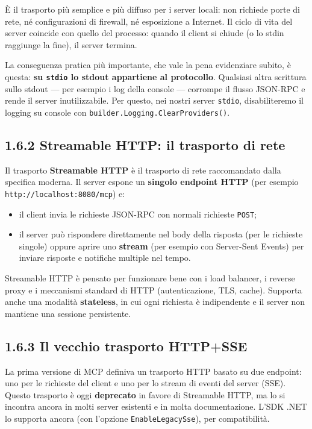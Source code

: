 \documentclass[
  italian,
  10pt,
]{book}
\providecommand{\tightlist}{%
  \setlength{\itemsep}{0pt}\setlength{\parskip}{0pt}}
\begin{document}
È il trasporto più semplice e più diffuso per i server locali: non
richiede porte di rete, né configurazioni di firewall, né esposizione a
Internet. Il ciclo di vita del server coincide con quello del processo:
quando il client si chiude (o lo stdin raggiunge la fine), il server
termina.

La conseguenza pratica più importante, che vale la pena evidenziare
subito, è questa: \textbf{su \texttt{stdio} lo stdout appartiene al
protocollo}. Qualsiasi altra scrittura sullo stdout --- per esempio i
log della console --- corrompe il flusso JSON-RPC e rende il server
inutilizzabile. Per questo, nei nostri server \texttt{stdio},
disabiliteremo il logging su console con
\texttt{builder.Logging.ClearProviders()}.

\subsection{1.6.2 Streamable HTTP: il trasporto di
rete}\label{streamable-http-il-trasporto-di-rete}

Il trasporto \textbf{Streamable HTTP} è il trasporto di rete
raccomandato dalla specifica moderna. Il server espone un
\textbf{singolo endpoint HTTP} (per esempio
\texttt{http://localhost:8080/mcp}) e:

\begin{itemize}
\tightlist
\item
  il client invia le richieste JSON-RPC con normali richieste
  \texttt{POST};
\item
  il server può rispondere direttamente nel body della risposta (per le
  richieste singole) oppure aprire uno \textbf{stream} (per esempio con
  Server-Sent Events) per inviare risposte e notifiche multiple nel
  tempo.
\end{itemize}

Streamable HTTP è pensato per funzionare bene con i load balancer, i
reverse proxy e i meccanismi standard di HTTP (autenticazione, TLS,
cache). Supporta anche una modalità \textbf{stateless}, in cui ogni
richiesta è indipendente e il server non mantiene una sessione
persistente.

\subsection{1.6.3 Il vecchio trasporto
HTTP+SSE}\label{il-vecchio-trasporto-httpsse}

La prima versione di MCP definiva un trasporto HTTP basato su due
endpoint: uno per le richieste del client e uno per lo stream di eventi
del server (SSE). Questo trasporto è oggi \textbf{deprecato} in favore
di Streamable HTTP, ma lo si incontra ancora in molti server esistenti e
in molta documentazione. L'SDK .NET lo supporta ancora (con l'opzione
\texttt{EnableLegacySse}), per compatibilità.
\end{document}
